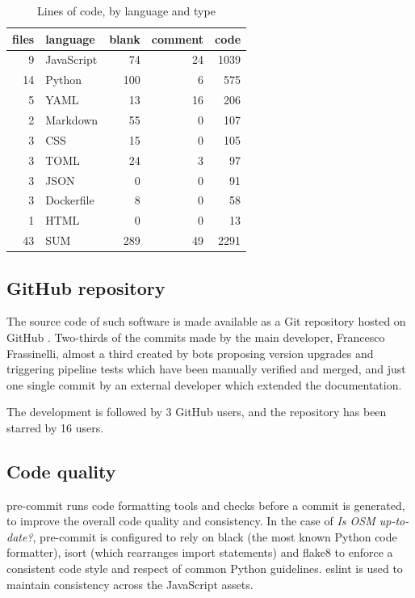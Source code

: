 \documentclass{Configuration_Files/PoliMi3i_thesis}
\begin{document}
\begin{table}[ht]
    \centering
    \begin{tabular}{r|l|r|r|r}
files & language & blank & comment & code \\
\hline
9 & JavaScript & 74 & 24 & 1039 \\
14 & Python & 100 & 6 & 575 \\
5 & YAML & 13 & 16 & 206 \\
2 & Markdown & 55 & 0 & 107 \\
3 & CSS & 15 & 0 & 105 \\
3 & TOML & 24 & 3 & 97 \\
3 & JSON & 0 & 0 & 91 \\
3 & Dockerfile & 8 & 0 & 58 \\
1 & HTML & 0 & 0 & 13 \\
\hline
43 & SUM & 289 & 49 & 2291 \\
    \end{tabular}
    \caption{Lines of code, by language and type}
    \label{tab:loc}
\end{table}

\subsection{GitHub repository}

The source code of such software is made available as a Git repository hosted on GitHub \cite{frassinelliOSMUptodate2022}. Two-thirds of the commits made by the main developer, Francesco Frassinelli, almost a third created by bots proposing version upgrades and triggering pipeline tests which have been manually verified and merged, and just one single commit by an external developer which extended the documentation.

The development is followed by 3 GitHub users, and the repository has been starred by 16 users.

\subsection{Code quality}

pre-commit \cite{PrecommitPrecommit2022} runs code formatting tools and checks before a commit is generated, to improve the overall code quality and consistency. In the case of \textit{Is OSM up-to-date?}, pre-commit is configured to rely on black \cite{PsfBlack2022} (the most known Python code formatter), isort \cite{PyCQAIsort2022} (which rearranges import statements) and flake8 \cite{PyCQAFlake82022} to enforce a consistent code style and respect of common Python guidelines. eslint \cite{ESLint2022} is used to maintain consistency across the JavaScript assets.
\end{document}
